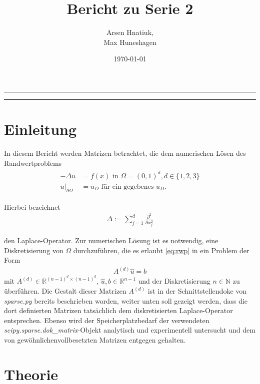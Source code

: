 \documentclass[smallheadings]{scrartcl}
\title{Bericht zu Serie 2}
\author{%
  Arsen Hnatiuk,\\%
  Max Huneshagen 
}
\date{\today}
\begin{document}
\maketitle
\tableofcontents
\bigskip

\hrule
\hrule


\section{Einleitung}

In diesem Bericht werden Matrizen betrachtet, die dem numerischen Lösen des Randwertproblems 
\begin{align}
\begin{split}
-\Delta u&=f(x)\text{ in }\Omega=(0, 1)^d, d\in\{1,2,3\}\\
u \vert _{\partial\Omega}&=u_D\text{ für ein gegebenes }u_D.
\end{split}
\label{eq:rwp}
\end{align}

Hierbei bezeichnet 
\begin{align}
\Delta :=\sum_{j=1}^{d}\frac{\partial^2}{\partial x_j^2}
\end{align}

den Laplace-Operator. Zur numerischen Lösung ist es notwendig, eine Diskretisierung von $\Omega$ durchzuführen, die es erlaubt \eqref{eq:rwp} in ein Problem der Form 
\begin{align}
A^{(d)}\hat{u}=b
\label{eq:lgs}
\end{align}
mit $A^{(d)}\in\mathbb{R}^{(n-1)^d\times(n-1)^d}$, $\hat{u},b\in\mathbb{R}^{n-1}$ und der Diskretisierung $n\in\mathbb{N}$ zu überführen.
Die Gestalt dieser Matrizen $A^{(d)}$ ist in der Schnittstellendoke von \textit{sparse.py} bereits beschrieben worden, weiter unten soll gezeigt werden, dass die dort definierten Matrizen tatsächlich dem diskretisierten Laplace-Operator entsprechen. Ebenso wird der Speicherplatzbedarf der verwendeten \textit{scipy.sparse.dok\_matrix}-Objekt analytisch und experimentell untersucht und dem von \glqq gewöhnlichen\grqq vollbesetzten Matrizen entgegen gehalten.
\section{Theorie}
\end{document}
